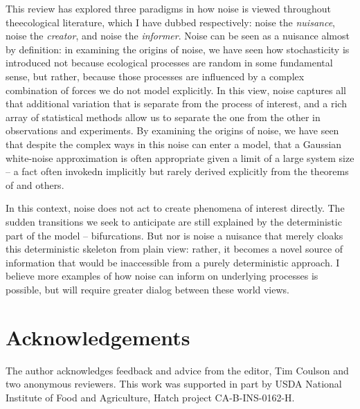\documentclass[preprint, 3p,
authoryear]{elsarticle} %
\begin{document}
This review has explored three paradigms in how noise is viewed
throughout theecological literature, which I have dubbed respectively:
noise the \emph{nuisance}, noise the \emph{creator}, and noise the
\emph{informer}. Noise can be seen as a nuisance almost by definition:
in examining the origins of noise, we have seen how stochasticity is
introduced not because ecological processes are random in some
fundamental sense, but rather, because those processes are influenced by
a complex combination of forces we do not model explicitly. In this
view, noise captures all that additional variation that is separate from
the process of interest, and a rich array of statistical methods allow
us to separate the one from the other in observations and experiments.
By examining the origins of noise, we have seen that despite the complex
ways in this noise can enter a model, that a Gaussian white-noise
approximation \citep{vanKampen2007, Black2012} is often appropriate
given a limit of a large system size -- a fact often invokedn implicitly
but rarely derived explicitly from the theorems of \citet{Kurtz1978} and
others.

In this context, noise does not act to create phenomena of interest
directly. The sudden transitions we seek to anticipate are still
explained by the deterministic part of the model -- bifurcations. But
nor is noise a nuisance that merely cloaks this deterministic skeleton
from plain view: rather, it becomes a novel source of information that
would be inaccessible from a purely deterministic approach. I believe
more examples of how noise can inform on underlying processes is
possible, but will require greater dialog between these world views.

\hypertarget{acknowledgements}{%
\section{Acknowledgements}\label{acknowledgements}}

The author acknowledges feedback and advice from the editor, Tim Coulson
and two anonymous reviewers. This work was supported in part by USDA
National Institute of Food and Agriculture, Hatch project
CA-B-INS-0162-H.

\renewcommand\refname{References}

\end{document}
